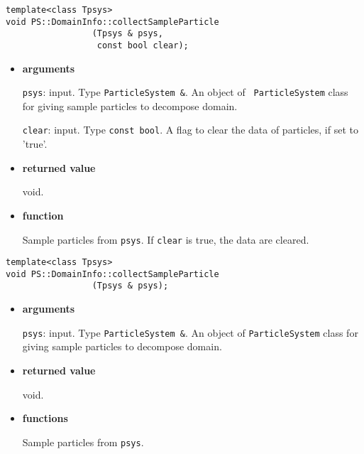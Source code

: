 \begin{screen}
\begin{verbatim}
template<class Tpsys>
void PS::DomainInfo::collectSampleParticle
                 (Tpsys & psys,
                  const bool clear);
\end{verbatim}
\end{screen}

\begin{itemize}

\item {\bf arguments}



\texttt{psys}: input. Type {\tt ParticleSystem \&}. An object of {\tt
ParticleSystem} class for giving sample particles to decompose domain.

\texttt{clear}: input. Type \texttt{const bool}. A flag to clear the data of particles,
if set to 'true'.

\item {\bf returned value}

void.

\item {\bf function}

Sample particles from {\tt psys}. If \texttt{clear} is true, the data
are cleared.


\end{itemize}

\begin{screen}
\begin{verbatim}
template<class Tpsys>
void PS::DomainInfo::collectSampleParticle
                 (Tpsys & psys);
\end{verbatim}
\end{screen}

\begin{itemize}

\item {\bf arguments}


\texttt{psys}: input. Type {\tt ParticleSystem \&}. An object of {\tt ParticleSystem} class
for giving sample particles to decompose domain.

\item {\bf returned value}

void.

\item {\bf functions}

Sample particles from {\tt psys}.

\end{itemize}

